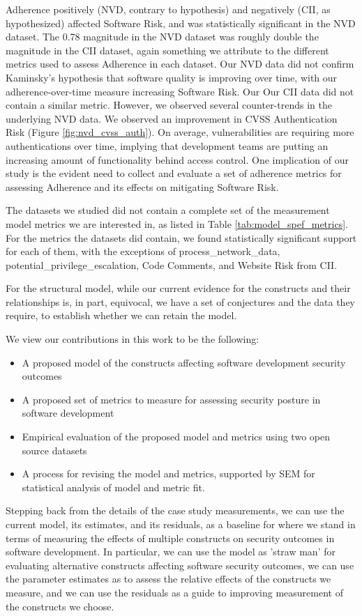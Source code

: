 Adherence positively (NVD, contrary to hypothesis) and negatively (CII, as hypothesized) affected Software Risk, and was statistically significant in the NVD dataset. The 0.78 magnitude in the NVD dataset was roughly double the magnitude in the CII dataset, again something we attribute to the different metrics used to assess Adherence in each dataset.  Our NVD data did not confirm Kaminsky's hypothesis that software quality is improving over time, with our adherence-over-time measure increasing Software Risk. Our Our CII data did not contain a similar metric. However, we observed several counter-trends in the underlying NVD data. We observed an improvement in CVSS Authentication Risk (Figure \ref{fig:nvd_cvss_auth}). On average, vulnerabilities are requiring more authentications over time, implying that development teams are putting an increasing amount of functionality behind access control. One implication of our study is the evident need to collect and evaluate a set of adherence metrics for assessing Adherence and its effects on mitigating Software Risk.

The datasets we studied did not contain a complete set of the measurement model metrics we are interested in, as listed in Table \ref{tab:model_spef_metrics}. For the metrics the datasets did contain, we found statistically significant support for each of them, with the exceptions of process\_network\_data, potential\_privilege\_escalation, Code Comments, and Website Risk from CII. 

For the structural model, while our current evidence for the constructs and their relationships is, in part, equivocal, we have a set of conjectures and the data they require, to establish whether we can retain the model. 

We view our contributions in this work to be the following:
\begin{itemize}
	\item A proposed model of the constructs affecting software development security outcomes
	\item A proposed set of metrics to measure for assessing security posture in software development
	\item Empirical evaluation of the proposed model and metrics using two open source datasets
	\item A process for revising the model and metrics, supported by SEM for statistical analysis of model and metric fit. 
\end{itemize}	

Stepping back from the details of the case study measurements, we can use the current model, its estimates, and its residuals, as a baseline for where we stand in terms of measuring the effects of multiple constructs on security outcomes in software development. In particular, we can use the model as 'straw man' for evaluating alternative constructs affecting software security outcomes, we can use the parameter estimates as to assess the relative effects of the constructs we measure, and we can use the residuals as a guide to improving measurement of the constructs we choose. 

